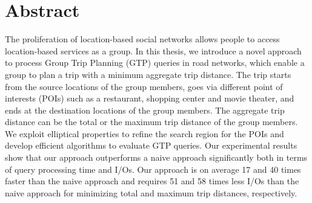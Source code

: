 \chapter*{Abstract}

\hspace{3ex} The proliferation of location-based social networks allows people to access location-based services as a group. In this thesis, we introduce a novel approach to process Group Trip Planning (GTP) queries in road networks, which enable a group to plan a trip with a minimum aggregate trip distance. The trip starts from the source locations of the group members, goes via different point of interests (POIs) such as a restaurant, shopping center and movie theater, and ends at the destination locations of the group members. The aggregate trip distance can be the total or the maximum trip distance of the group members. We exploit elliptical properties to refine the search region for the POIs and develop efficient algorithms to evaluate GTP queries. Our experimental results show that our approach outperforms a naive approach significantly both in terms of query processing time and I/Os. Our approach is on average 17 and 40 times faster than the naive approach and requires 51 and 58 times less I/Os than the naive approach for minimizing total and maximum trip distances, respectively. 

